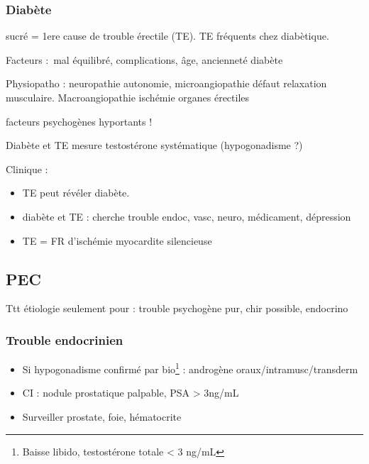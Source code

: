 \documentclass[11pt]{article}
\begin{document}
\subsubsection{Diabète}
\label{sec:orge965c33}
sucré = 1ere cause de trouble érectile (TE). TE fréquents chez diabètique. 

Facteurs : mal équilibré, complications, âge, ancienneté diabète

Physiopatho : neuropathie autonomie, microangiopathie \thus défaut relaxation
musculaire. Macroangiopathie \thus ischémie organes érectiles

\danger facteurs psychogènes hyportants !

Diabète et TE \thus mesure testostérone systématique (hypogonadisme ?)

Clinique : 
\begin{itemize}
\item TE peut révéler diabète.
\item diabète et TE : cherche trouble endoc, vasc, neuro, médicament, dépression
\item TE = FR d'ischémie myocardite silencieuse \danger
\end{itemize}

\subsection{PEC}
\label{sec:org1170062}
Ttt étiologie seulement pour : trouble psychogène pur, chir possible, endocrino

\subsubsection{Trouble endocrinien}
\label{sec:org6b5b030}
\begin{itemize}
\item Si hypogonadisme confirmé par bio\footnote{Baisse libido, testostérone totale < 3 ng/mL} : androgène oraux/intramusc/transderm
\item CI : nodule prostatique palpable, PSA > 3ng/mL
\item Surveiller prostate, foie, hématocrite
\end{itemize}
\end{document}
